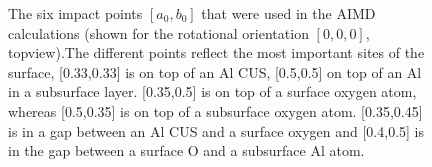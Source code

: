 \documentclass[11pt,DIV=13,BCOR=5mm,a4paper,headinclude]{scrbook}
\begin{document}
\begin{figure}[h!]
        \quad
        \quad
 \caption{The six impact points $[a_0,b_0]$ that were used in the AIMD calculations (shown for the rotational orientation $[0,0,0]$, topview).The different points reflect the most important sites of the surface, [0.33,0.33] is on top of an Al CUS, [0.5,0.5] on top of an Al in a subsurface layer.
[0.35,0.5] is on top of a surface oxygen atom, whereas [0.5,0.35] is on top of a subsurface oxygen atom.
[0.35,0.45] is in a gap between an Al CUS and a surface oxygen and [0.4,0.5] is in the gap between a surface O and a subsurface Al atom.}
        \label{abb:impact_points}
 \end{figure}
 
\end{document}
